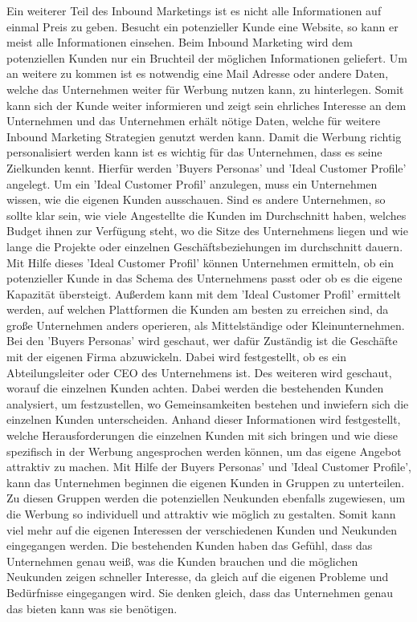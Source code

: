 \newline 
Ein weiterer Teil des Inbound Marketings ist es nicht alle Informationen auf einmal Preis zu geben. Besucht ein potenzieller Kunde eine Website, so kann er meist alle Informationen einsehen. Beim Inbound Marketing wird dem potenziellen Kunden nur ein Bruchteil der möglichen Informationen geliefert. Um an weitere zu kommen ist es notwendig eine Mail Adresse oder andere Daten, welche das Unternehmen weiter für Werbung nutzen kann, zu hinterlegen. Somit kann sich der Kunde weiter informieren und zeigt sein ehrliches Interesse an dem Unternehmen und das Unternehmen erhält nötige Daten, welche für weitere Inbound Marketing Strategien genutzt werden kann. 
\newline 
Damit die Werbung richtig personalisiert werden kann ist es wichtig für das Unternehmen, dass es seine Zielkunden kennt. Hierfür werden 'Buyers Personas' und 'Ideal Customer Profile' angelegt. 
\newline 
Um ein 'Ideal Customer Profil' anzulegen, muss ein Unternehmen wissen, wie die eigenen Kunden ausschauen. Sind es andere Unternehmen, so sollte klar sein, wie viele Angestellte die Kunden im Durchschnitt haben, welches Budget ihnen zur Verfügung steht, wo die Sitze des Unternehmens liegen und wie lange die Projekte oder einzelnen Geschäftsbeziehungen im durchschnitt dauern. Mit Hilfe dieses 'Ideal Customer Profil' können Unternehmen ermitteln, ob ein potenzieller Kunde in das Schema des Unternehmens passt oder ob es die eigene Kapazität übersteigt. Außerdem kann mit dem 'Ideal Customer Profil' ermittelt werden, auf welchen Plattformen die Kunden am besten zu erreichen sind, da große Unternehmen anders operieren, als Mittelständige oder Kleinunternehmen. 
\newline 
Bei den 'Buyers Personas' wird geschaut, wer dafür Zuständig ist die Geschäfte mit der eigenen Firma abzuwickeln. Dabei wird festgestellt, ob es ein Abteilungsleiter oder CEO des Unternehmens ist. Des weiteren wird geschaut, worauf die einzelnen Kunden achten. Dabei werden die bestehenden Kunden analysiert, um festzustellen, wo Gemeinsamkeiten bestehen und inwiefern sich die einzelnen Kunden unterscheiden. Anhand dieser Informationen wird festgestellt, welche Herausforderungen die einzelnen Kunden mit sich bringen und wie diese spezifisch in der Werbung angesprochen werden können, um das eigene Angebot attraktiv zu machen. 
\newline 
Mit Hilfe der Buyers Personas' und 'Ideal Customer Profile', kann das Unternehmen beginnen die eigenen Kunden in Gruppen zu unterteilen. Zu diesen Gruppen werden die potenziellen Neukunden ebenfalls zugewiesen, um die Werbung so individuell und attraktiv wie möglich zu gestalten. Somit kann viel mehr auf die eigenen Interessen der verschiedenen Kunden und Neukunden eingegangen werden. Die bestehenden Kunden haben das Gefühl, dass das Unternehmen genau weiß, was die Kunden brauchen und die möglichen Neukunden zeigen schneller Interesse, da gleich auf die eigenen Probleme und Bedürfnisse eingegangen wird. Sie denken gleich, dass das Unternehmen genau das bieten kann was sie benötigen. 
